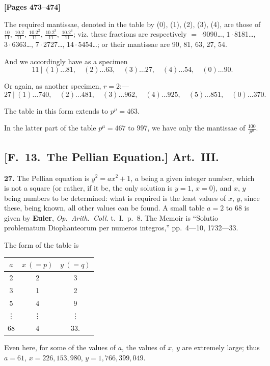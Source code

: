 \documentclass[11pt,a4paper]{article}
\begin{document}
\newpage
\textbf{[Pages 473--474]}

The required mantissae, denoted in the table by (0), (1), (2), (3), (4),
are those of $\frac{10}{11}$, $\frac{10.2}{11}$, $\frac{10.2^{2}}{11}$, $\frac{10.2^{3}}{11}$, $\frac{10.2^{4}}{11}$;
viz. these fractions are respectively $=$ $\cdot$9090\ldots, $1\cdot$8181\ldots, $3\cdot$6363\ldots,
$7\cdot$2727\ldots, $14\cdot$5454\ldots; or their mantissae are 90, 81, 63, 27, 54.

And we accordingly have as a specimen
\[11\ \big|\ (1)\ldots 81,\quad (2)\ldots 63,\quad (3)\ldots 27,\quad (4)\ldots 54,\quad (0)\ldots 90.\]

Or again, as another specimen, $r = 2$:---
\[27\ \big|\ (1)\ldots 740,\quad (2)\ldots 481,\quad (3)\ldots 962,\quad (4)\ldots 925,\quad (5)\ldots 851,\quad (0)\ldots 370.\]

The table in this form extends to $p^{\mu} = 463$.

In the latter part of the table $p^{\mu} = 467$ to 997, we have only the mantissae of $\frac{100}{p^{\mu}}$.

\subsection*{[F.\ 13.\ The Pellian Equation.] Art.\ III.}

\textbf{27.} The Pellian equation is $y^{2} = ax^{2} + 1$, $a$ being a given integer number, which is not a square
(or rather, if it be, the only solution is $y = 1$, $x = 0$), and $x$, $y$ being numbers to be determined:
what is required is the least values of $x$, $y$, since these, being known, all other values can be found.
A small table $a = 2$ to 68 is given by
\quad\textbf{Euler}, \textit{Op.\ Arith.\ Coll.} t.\ I.\ p.\ 8. The Memoir is ``Solutio problematum Diophanteorum per numeros integros,'' pp.\ 4---10, 1732---33.

The form of the table is
\begin{center}\begin{tabular}{c|cc}$a$ & $x\ (=p)$ & $y\ (=q)$ \\
\hline
2 & 2 & 3 \\
3 & 1 & 2 \\
5 & 4 & 9 \\
\vdots & \vdots & \vdots \\
68 & 4 & 33.\end{tabular}\end{center}

Even here, for some of the values of $a$, the values of $x$, $y$ are extremely large;
thus $a = 61$, $x = 226{,}153{,}980$, $y = 1{,}766{,}399{,}049$.
\end{document}
